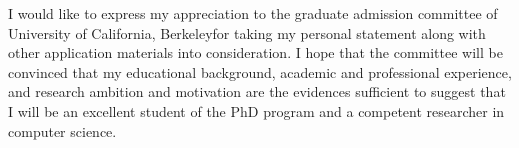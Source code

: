 \documentclass[a4paper,10pt]{report}
\newcommand{\university}{University of California, Berkeley}
\begin{document}
\vspace{0.2cm}
I would like to express my appreciation to the graduate admission committee of \university \space for taking my personal statement along with other application materials into consideration. I hope that the committee will be convinced that my educational background, academic and professional experience, and research ambition and motivation are the evidences sufficient to suggest that I will be an excellent student of the PhD program and a competent researcher in computer science.
\end{document}
